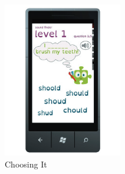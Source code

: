 \begin{figure}[!hbt]
\begin{subfigure}{0.25\textwidth}
        \includegraphics[width=\textwidth]{poten7}
        \caption{Choosing It}
    \end{subfigure}\hspace{0.05\textwidth}
\begin{subfigure}{0.25\textwidth}

\end{subfigure}
\end{figure}
